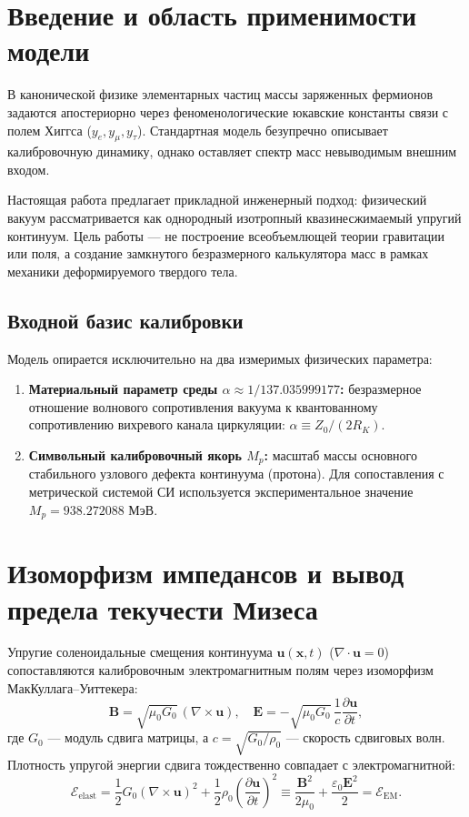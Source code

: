 \documentclass[11pt,a4paper]{article}
\theoremstyle{definition}
\theoremstyle{remark}
\begin{document}
\section{Введение и область применимости модели}
В канонической физике элементарных частиц массы заряженных фермионов задаются апостериорно через феноменологические юкавские константы связи с полем Хиггса ($y_e, y_\mu, y_\tau$). Стандартная модель безупречно описывает калибровочную динамику, однако оставляет спектр масс невыводимым внешним входом.

Настоящая работа предлагает прикладной инженерный подход: физический вакуум рассматривается как однородный изотропный квазинесжимаемый упругий континуум. Цель работы — не построение всеобъемлющей теории гравитации или поля, а создание замкнутого безразмерного калькулятора масс в рамках механики деформируемого твердого тела.

\subsection{Входной базис калибровки}
Модель опирается исключительно на два измеримых физических параметра:
\begin{enumerate}
    \item \textbf{Материальный параметр среды $\alpha \approx 1/137.035999177$:} безразмерное отношение волнового сопротивления вакуума к квантованному сопротивлению вихревого канала циркуляции: $\alpha \equiv Z_0 / (2 R_K)$.
    \item \textbf{Символьный калибровочный якорь $M_p$:} масштаб массы основного стабильного узлового дефекта континуума (протона). Для сопоставления с метрической системой СИ используется экспериментальное значение $M_p = 938.272088\text{ МэВ}$.
\end{enumerate}

\section{Изоморфизм импедансов и вывод предела текучести Мизеса}
Упругие соленоидальные смещения континуума $\mathbf{u}(\mathbf{x}, t)$ ($\nabla \cdot \mathbf{u} = 0$) сопоставляются калибровочным электромагнитным полям через изоморфизм МакКуллага--Уиттекера:
\begin{equation}
    \mathbf{B} = \sqrt{\mu_0 G_0} \, (\nabla \times \mathbf{u}), \quad 
    \mathbf{E} = -\sqrt{\mu_0 G_0} \, \frac{1}{c} \frac{\partial \mathbf{u}}{\partial t},
\end{equation}
где $G_0$ — модуль сдвига матрицы, а $c = \sqrt{G_0/\rho_0}$ — скорость сдвиговых волн. Плотность упругой энергии сдвига тождественно совпадает с электромагнитной:
\begin{equation}
    \mathcal{E}_{\mathrm{elast}} = \frac{1}{2} G_0 (\nabla \times \mathbf{u})^2 + \frac{1}{2}\rho_0 \left(\frac{\partial \mathbf{u}}{\partial t}\right)^2 \equiv \frac{\mathbf{B}^2}{2\mu_0} + \frac{\varepsilon_0 \mathbf{E}^2}{2} = \mathcal{E}_{\mathrm{EM}}.
\end{equation}
\end{document}
